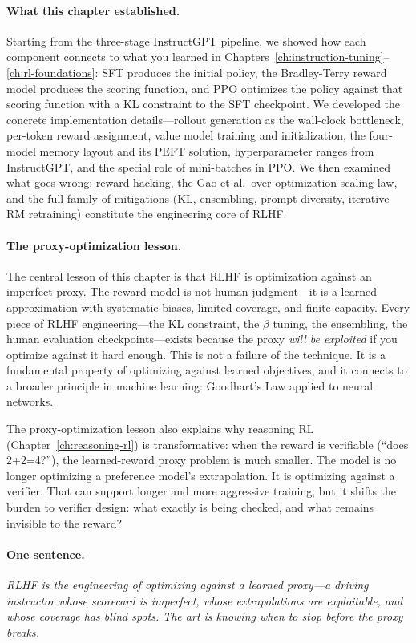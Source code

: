 \paragraph{What this chapter established.} Starting from the three-stage InstructGPT pipeline, we showed how each component connects to what you learned in Chapters~\ref{ch:instruction-tuning}--\ref{ch:rl-foundations}: SFT produces the initial policy, the Bradley-Terry reward model produces the scoring function, and PPO optimizes the policy against that scoring function with a KL constraint to the SFT checkpoint. We developed the concrete implementation details---rollout generation as the wall-clock bottleneck, per-token reward assignment, value model training and initialization, the four-model memory layout and its PEFT solution, hyperparameter ranges from InstructGPT, and the special role of mini-batches in PPO. We then examined what goes wrong: reward hacking, the Gao et al.\ over-optimization scaling law, and the full family of mitigations (KL, ensembling, prompt diversity, iterative RM retraining) constitute the engineering core of RLHF.

\paragraph{The proxy-optimization lesson.} The central lesson of this chapter is that RLHF is optimization against an imperfect proxy. The reward model is not human judgment---it is a learned approximation with systematic biases, limited coverage, and finite capacity. Every piece of RLHF engineering---the KL constraint, the $\beta$ tuning, the ensembling, the human evaluation checkpoints---exists because the proxy \emph{will be exploited} if you optimize against it hard enough. This is not a failure of the technique. It is a fundamental property of optimizing against learned objectives, and it connects to a broader principle in machine learning: Goodhart's Law applied to neural networks.

The proxy-optimization lesson also explains why reasoning RL (Chapter~\ref{ch:reasoning-rl}) is transformative: when the reward is verifiable (``does 2+2=4?''), the learned-reward proxy problem is much smaller. The model is no longer optimizing a preference model's extrapolation. It is optimizing against a verifier. That can support longer and more aggressive training, but it shifts the burden to verifier design: what exactly is being checked, and what remains invisible to the reward?

\paragraph{One sentence.} \emph{RLHF is the engineering of optimizing against a learned proxy---a driving instructor whose scorecard is imperfect, whose extrapolations are exploitable, and whose coverage has blind spots. The art is knowing when to stop before the proxy breaks.}

